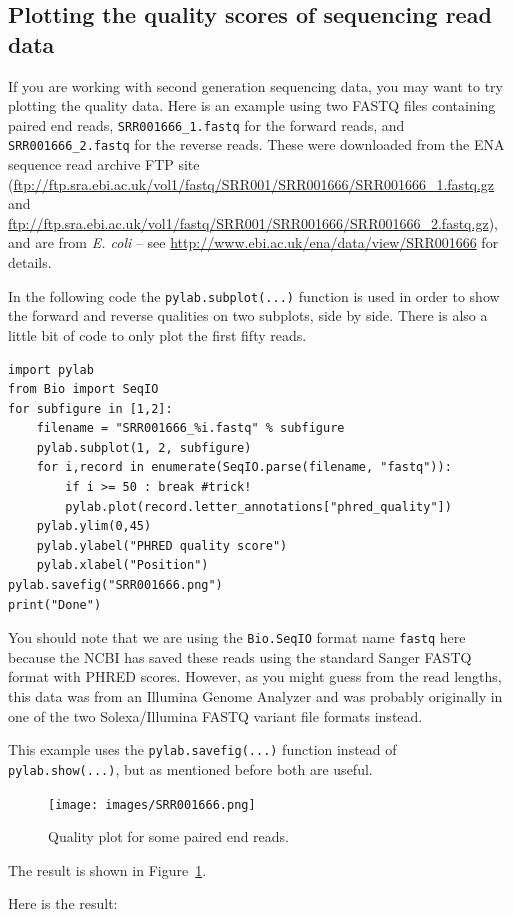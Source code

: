 \documentclass{report}
\begin{document}
\subsection{Plotting the quality scores of sequencing read data}

If you are working with second generation sequencing data, you may want to try plotting
the quality data. Here is an example using two FASTQ files containing paired end reads,
\texttt{SRR001666\_1.fastq} for the forward reads, and  \texttt{SRR001666\_2.fastq} for
the reverse reads. These were downloaded from the ENA sequence read archive FTP site
(\url{ftp://ftp.sra.ebi.ac.uk/vol1/fastq/SRR001/SRR001666/SRR001666_1.fastq.gz} and
\url{ftp://ftp.sra.ebi.ac.uk/vol1/fastq/SRR001/SRR001666/SRR001666_2.fastq.gz}), and
are from \textit{E. coli} -- see \url{http://www.ebi.ac.uk/ena/data/view/SRR001666}
for details.

In the following code the \verb|pylab.subplot(...)| function is used in order to show
the forward and reverse qualities on two subplots, side by side. There is also a little
bit of code to only plot the first fifty reads.

\begin{verbatim}
import pylab
from Bio import SeqIO
for subfigure in [1,2]:
    filename = "SRR001666_%i.fastq" % subfigure
    pylab.subplot(1, 2, subfigure)
    for i,record in enumerate(SeqIO.parse(filename, "fastq")):
        if i >= 50 : break #trick!
        pylab.plot(record.letter_annotations["phred_quality"])
    pylab.ylim(0,45)
    pylab.ylabel("PHRED quality score")
    pylab.xlabel("Position")
pylab.savefig("SRR001666.png")
print("Done")
\end{verbatim}

You should note that we are using the \verb|Bio.SeqIO| format name \texttt{fastq}
here because the NCBI has saved these reads using the standard Sanger FASTQ format
with PHRED scores. However, as you might guess from the read lengths, this data was
from an Illumina Genome Analyzer and was probably originally in one of the two
Solexa/Illumina FASTQ variant file formats instead.

This example uses the \verb|pylab.savefig(...)| function instead of
\verb|pylab.show(...)|, but as mentioned before both are useful.
\begin{latexonly}
\begin{figure}[htbp]
\centering
\texttt{[image: images/SRR001666.png]}
\caption{Quality plot for some paired end reads.}
\label{fig:paired-end-qual-plot}
\end{figure}
The result is shown in Figure~\ref{fig:paired-end-qual-plot}.
\end{latexonly}
\begin{htmlonly}
Here is the result:


\end{htmlonly}
\end{document}
